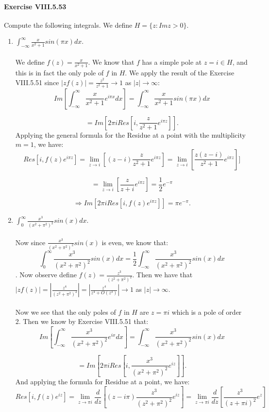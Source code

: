 \documentclass[10pt]{article}
\begin{document}
\paragraph{Exercise VIII.5.53}
Compute the following integrals. We define $H = \{z:Imz > 0\}$. 
\begin{enumerate}
\item $\int_{-\infty}^\infty \frac{x}{x^2 + 1}sin(\pi x)dx$. \\\\
We define $f(z) = \frac{x}{x^2 + 1}$. We know that $f$ has a simple pole at $z = i \in H$, and this is in fact the only pole of $f$ in $H$. We apply the result of the Exercise VIII.5.51 since $|zf(z)| = \frac{z^2}{z^2 +1} \rightarrow 1$ as $|z| \to \infty$: 
\[Im\left[\int_{-\infty}^\infty \frac{x}{x^2 + 1}e^{i\pi x}dx\right] = \int_{-\infty}^\infty \frac{x}{x^2 + 1}sin(\pi x)dx\] 

\[ =Im\left[ 2\pi i Res[i,\frac{z}{z^2 + 1}e^{i\pi z}]\right]. \]
Applying the general formula for the Residue at a point with the multiplicity $m = 1$, we have: 
\[Res[i,f(z)e^{i\pi z}] = \lim_{z \to i}[(z-i)\frac{z}{z^2 + 1}e^{i\pi z}] = \lim_{z \to i}[\frac{z(z-i)}{z^2 + 1}e^{i\pi z}]]\]

\[= \lim_{z \to i}[\frac{z}{z + i}e^{i\pi z}] = \frac{1}{2}e^{-\pi}\]

\[\Rightarrow Im[2\pi i Res[i,f(z)e^{i\pi z}]] = \pi e^{-\pi}. \]


\item $\int_{0}^\infty \frac{x^3}{(x^2 + \pi^2)^2}sin(x)dx$. \\\\
Now since $\frac{x^3}{(x^2 + \pi^2)^2}sin(x)$ is even, we know that: 
\[\int_{0}^\infty \frac{x^3}{(x^2 + \pi^2)^2}sin(x)dx = \frac{1}{2 }\int_{-\infty}^\infty \frac{x^3}{(x^2 + \pi^2)^2}sin(x)dx\]. 
Now observe define $f(z) = \frac{z^3}{(z^2 + \pi^2)^2}$. Then we have that $|zf(z)| = \left|\frac{z^4}{(z^2 + \pi^2)^2}\right| = \left|\frac{z^4}{z^4 + O(z^3)}\right| \rightarrow 1$ as $|z| \to \infty$. \\\\
Now we see that the only poles of $f$ in $H$ are $z = \pi i$ which is a pole of order 2. Then we know by Exercise VIII.5.51 that: 
\[Im[\int_{-\infty}^\infty \frac{x^3}{(x^2 + \pi^2)^2}e^{ix}dx] = \int_{-\infty}^\infty \frac{x^3}{(x^2 + \pi^2)^2}sin(x)dx \]


\[=Im\left[ 2\pi i Res[i,\frac{x^3}{(x^2 + \pi^2)^2}e^{iz}]\right].\]
And applying the formula for Residue at a point, we have: 
\[Res[i,f(z)e^{iz}] = \lim_{z \to \pi i}\frac{d}{dz}[(z-i\pi)\frac{z^3}{(z^2 + \pi^2)^2}e^{iz}] = \lim_{z \to \pi i}\frac{d}{dz}[\frac{z^3}{(z+ \pi i)^2}e^{ z}]\]


\end{enumerate}
\end{document}
